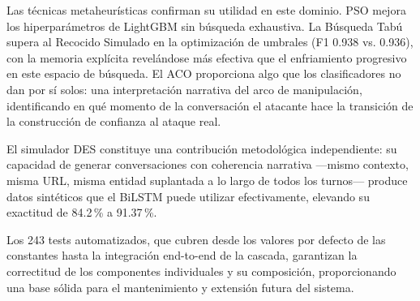 \documentclass{llncs}
\begin{document}
Las técnicas metaheurísticas confirman su utilidad en este dominio.
PSO mejora los hiperparámetros de LightGBM sin búsqueda exhaustiva.
La Búsqueda Tabú supera al Recocido Simulado en la optimización
de umbrales (F1 0.938 vs. 0.936), con la memoria explícita
revelándose más efectiva que el enfriamiento progresivo en este
espacio de búsqueda.
El ACO proporciona algo que los clasificadores no dan por sí solos:
una interpretación narrativa del arco de manipulación,
identificando en qué momento de la conversación el atacante
hace la transición de la construcción de confianza al ataque real.

El simulador DES constituye una contribución metodológica
independiente: su capacidad de generar conversaciones con coherencia
narrativa —mismo contexto, misma URL, misma entidad suplantada
a lo largo de todos los turnos— produce datos sintéticos
que el BiLSTM puede utilizar efectivamente, elevando su exactitud
de 84.2\,\% a 91.37\,\%.

Los 243 tests automatizados, que cubren desde los valores por defecto
de las constantes hasta la integración end-to-end de la cascada,
garantizan la correctitud de los componentes individuales y su
composición, proporcionando una base sólida para el mantenimiento
y extensión futura del sistema.
\end{document}
